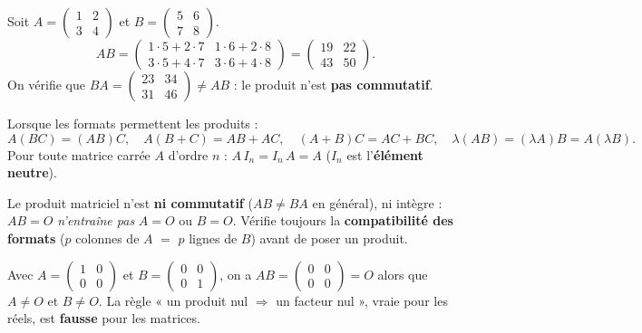 \begin{exemple}
Soit $A=\begin{pmatrix}1&2\\3&4\end{pmatrix}$ et $B=\begin{pmatrix}5&6\\7&8\end{pmatrix}$.
\[
AB=\begin{pmatrix}1\cdot5+2\cdot7 & 1\cdot6+2\cdot8\\ 3\cdot5+4\cdot7 & 3\cdot6+4\cdot8\end{pmatrix}
=\begin{pmatrix}19&22\\43&50\end{pmatrix}.
\]
On vérifie que $BA=\begin{pmatrix}23&34\\31&46\end{pmatrix}\neq AB$ : le produit n'est
\textbf{pas commutatif}.
\end{exemple}

\begin{propriete}
Lorsque les formats permettent les produits :
\[
A(BC)=(AB)C,\quad A(B+C)=AB+AC,\quad (A+B)C=AC+BC,\quad \lambda(AB)=(\lambda A)B=A(\lambda B).
\]
Pour toute matrice carrée $A$ d'ordre $n$ : $A\,I_n=I_n\,A=A$ ($I_n$ est l'\textbf{élément neutre}).
\end{propriete}

\begin{aretenir}
Le produit matriciel n'est \textbf{ni commutatif} ($AB\neq BA$ en général), ni intègre :
$AB=O$ \emph{n'entraîne pas} $A=O$ ou $B=O$. Vérifie toujours la \textbf{compatibilité des
formats} ($p$ colonnes de $A$ $=$ $p$ lignes de $B$) avant de poser un produit.
\end{aretenir}

\begin{exemple}
Avec $A=\begin{pmatrix}1&0\\0&0\end{pmatrix}$ et $B=\begin{pmatrix}0&0\\0&1\end{pmatrix}$, on a
$AB=\begin{pmatrix}0&0\\0&0\end{pmatrix}=O$ alors que $A\neq O$ et $B\neq O$. La règle
« un produit nul $\Rightarrow$ un facteur nul », vraie pour les réels, est \textbf{fausse} pour
les matrices.
\end{exemple}

